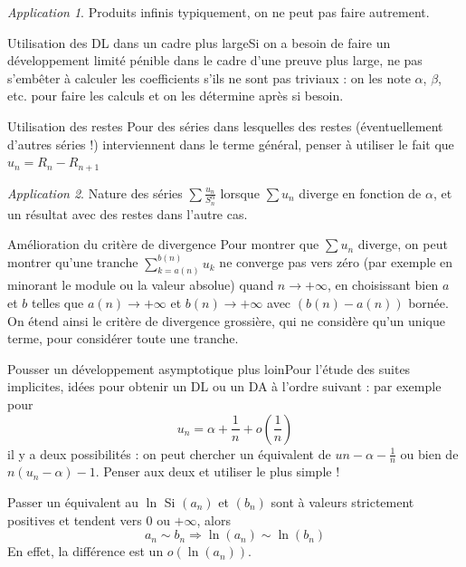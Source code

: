 \documentclass[french]{book}
\theoremstyle{plain}
\theoremstyle{definition}
\theoremstyle{remark}
\newtheorem*{app}{Application}
\begin{document}
\begin{app}
	Produits infinis typiquement, on ne peut pas faire autrement.
\end{app}
\begin{AS}{Utilisation des DL dans un cadre plus large}Si on a besoin de faire un développement limité pénible dans le cadre d’une preuve plus large, ne pas s’embêter à calculer les coefficients s’ils ne sont pas triviaux : on les note $\alpha$, $\beta$, etc. pour faire les calculs et on les détermine après si besoin.
\end{AS}
\begin{AS}{Utilisation des restes} Pour des séries dans lesquelles des restes (éventuellement d’autres séries !) interviennent dans le terme général, penser à utiliser le fait que $u_n = R_n-R_{n+1}$
\end{AS}
\begin{app}
	Nature des séries $\displaystyle \sum\frac{u_n}{S_n^\alpha}$ lorsque $\sum u_n$ diverge en fonction de $\alpha$, et un résultat avec des restes dans l'autre cas.
\end{app}
\begin{AS}{Amélioration du critère de divergence} Pour montrer que $\sum u_n$ diverge, on peut montrer qu’une tranche $\displaystyle \sum_{k=a(n)}^{b(n)}u_k$ ne converge pas vers zéro (par exemple en minorant le module ou la valeur absolue) quand
$n\to+\infty$, en choisissant bien $a$ et $b$ telles que $a(n)\to+\infty$ et $b(n)\to+\infty$ avec $(b(n)-a(n))$ bornée. On étend ainsi le critère de divergence grossière, qui ne considère qu’un unique terme, pour considérer toute une tranche.
\end{AS}
\begin{AS}{Pousser un développement asymptotique plus loin}Pour l’étude des suites implicites, idées pour obtenir un DL ou un DA à l’ordre suivant : par exemple pour $$u_n = \alpha + \frac{1}{n} + o\left(\frac{1}{n}\right)$$ il y a deux possibilités : on peut
chercher un équivalent de $un -\alpha-\displaystyle\frac{1}{n}$ ou bien de $n(u_n-\alpha)-1$. Penser aux deux et utiliser le plus simple !
\end{AS}
\begin{AS}{Passer un équivalent au $\ln$} Si $(a_n)$ et $(b_n)$ sont à valeurs strictement positives et tendent vers $0$ ou $+\infty$, alors $$a_n\sim b_n\Longrightarrow \ln(a_n)\sim\ln(b_n)$$ En effet, la différence est un $o(\ln(a_n))$.
\end{AS}
\end{document}
